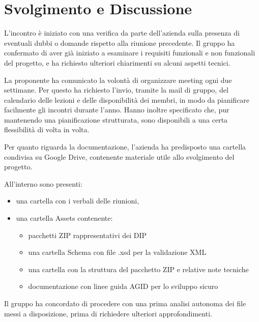 \documentclass[a4paper,12pt]{article}
\begin{document}
\vspace{0.5cm}

\section{Svolgimento e Discussione}
L’incontro è iniziato con una verifica da parte dell’azienda sulla presenza di eventuali dubbi o domande rispetto alla riunione precedente.
Il gruppo ha confermato di aver già iniziato a esaminare i requisiti funzionali e non funzionali del progetto, e ha richiesto ulteriori chiarimenti su alcuni aspetti tecnici.

La proponente ha comunicato la volontà di organizzare meeting ogni due settimane. Per questo ha richiesto l’invio, tramite la mail di gruppo, del calendario delle lezioni e delle disponibilità dei membri, in modo da pianificare facilmente gli incontri durante l’anno. Hanno inoltre specificato che, pur mantenendo una pianificazione strutturata, sono disponibili a una certa flessibilità di volta in volta.

Per quanto riguarda la documentazione, l’azienda ha predisposto una cartella condivisa su Google Drive, contenente materiale utile allo svolgimento del progetto.

All’interno sono presenti:
\begin{itemize}
    \item una cartella con i verbali delle riunioni,
    \item una cartella Assets contenente:
    \begin{itemize}
        \item pacchetti ZIP rappresentativi dei DIP
        \item una cartella Schema con file .xsd per la validazione XML
        \item una cartella con la struttura del pacchetto ZIP e relative note tecniche
        \item documentazione con linee guida AGID per lo sviluppo sicuro
    \end{itemize}
\end{itemize}


Il gruppo ha concordato di procedere con una prima analisi autonoma dei file messi a disposizione, prima di richiedere ulteriori approfondimenti.
\end{document}
